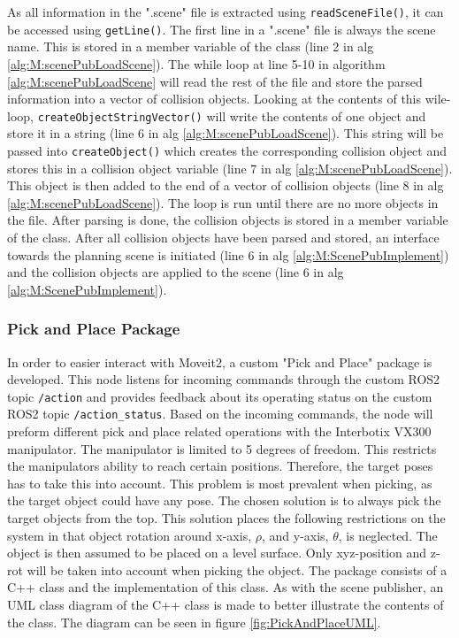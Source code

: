 

As all information in the ".scene" file is extracted using \lstinline{readSceneFile()}, it can be accessed using \lstinline{getLine()}. The first line in a ".scene" file is always the scene name. This is stored in a member variable of the class (line 2 in alg \ref{alg:M:scenePubLoadScene}). The while loop at line 5-10 in algorithm \ref{alg:M:scenePubLoadScene} will read the rest of the file and store the parsed information into a vector of collision objects. Looking at the contents of this wile-loop, \lstinline{createObjectStringVector()} will write the contents of one object and store it in a string (line 6 in alg \ref{alg:M:scenePubLoadScene}). This string will be passed into \lstinline{createObject()} which creates the corresponding collision object and stores this in a collision object variable (line 7 in alg \ref{alg:M:scenePubLoadScene}). This object is then added to the end of a vector of collision objects (line 8 in alg \ref{alg:M:scenePubLoadScene}). The loop is run until there are no more objects in the file. After parsing is done, the collision objects is stored in a member variable of the class. After all collision objects have been parsed and stored, an interface towards the planning scene is initiated (line 6 in alg \ref{alg:M:ScenePubImplement}) and the collision objects are applied to the scene (line 6 in alg \ref{alg:M:ScenePubImplement}).



\subsubsection{Pick and Place Package} \label{sec:M:A:HuskyPickAndPlace}
In order to easier interact with Moveit2, a custom "Pick and Place" package is developed. This node listens for incoming commands through the custom ROS2 topic \lstinline{/action} and provides feedback about its operating status on the custom ROS2 topic \lstinline{/action_status}. Based on the incoming commands, the node will preform different pick and place related operations with the Interbotix VX300 manipulator. The manipulator is limited to 5 degrees of freedom. This restricts the manipulators ability to reach certain positions. Therefore, the target poses has to take this into account. This problem is most prevalent when picking, as the target object could have any pose.
The chosen solution is to always pick the target objects from the top. This solution places the following restrictions on the system in that object rotation around x-axis, $\rho$, and y-axis, $\theta$, is neglected. The object is then assumed to be placed on a level surface. Only xyz-position and z-rot will be taken into account when picking the object. 
The package consists of a C++ class and the implementation of this class. As with the scene publisher, an UML class diagram of the C++ class is made to better illustrate the contents of the class. The diagram can be seen in figure \ref{fig:PickAndPlaceUML}.

